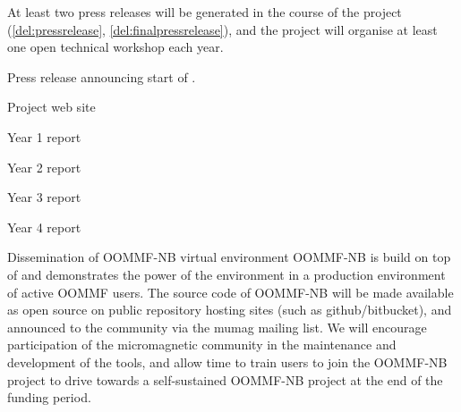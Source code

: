 \begin{workpackage}[id=dissem,wphases=18-48!.5,
  title=Dissemination,
  SARM=1,
  USORM=7]
\begin{tasklist}
\begin{task}[title=Dissemination and Communication activities]

  At least two press releases will be generated in the course of the
  project (\ref{del:pressrelease}, \ref{del:finalpressrelease}), and
  the project will organise at least one open technical workshop each
  year. %
\end{task}
\end{tasklist}

\begin{wpdelivs}
  \begin{wpdeliv}[due=3,id=del:pressrelease,dissem=??,nature=??]
      {Press release announcing start of \TheProject.}
\end{wpdeliv}%
  \begin{wpdeliv}[due=3,id=del:website,dissem=??,nature=??]
      {Project web site}
\end{wpdeliv}%
  \begin{wpdeliv}[due=12,id=del:periodic-rep-1,dissem=??,nature=??]
      {Year 1 report}
\end{wpdeliv}%
  \begin{wpdeliv}[due=24,id=del:periodic-rep-2,dissem=??,nature=??]
      {Year 2 report}
\end{wpdeliv}%
  \begin{wpdeliv}[due=36,id=del:periodic-rep-3,dissem=??,nature=??]
      {Year 3 report}
\end{wpdeliv}%
  \begin{wpdeliv}[due=48,id=del:periodic-rep-4,dissem=??,nature=??]
      {Year 4 report}
\end{wpdeliv}%
\end{wpdelivs}

\begin{tasklist}
\begin{task}{Dissemination of OOMMF-NB virtual environment}
  \label{task:dissemination-of-oommf-nb-virtual-environment}
  OOMMF-NB is build on top of \TheProject and demonstrates the power
  of the environment in a production environment of active OOMMF users. 
  The source code of OOMMF-NB will be made available as open source on
  public repository hosting sites (such as github/bitbucket), and
  announced to the community via the mumag mailing list. We will
  encourage participation of the micromagnetic community in the
  maintenance and development of the tools, and allow time to train
  users to join the OOMMF-NB project to drive towards a self-sustained
  OOMMF-NB project at the end of the funding period.


\end{task}
\end{tasklist}
\end{workpackage}
